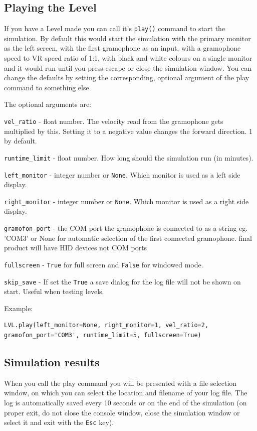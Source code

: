 \documentclass[11pt,a4paper]{article}
\newcommand{\param}[1]{\item \texttt{#1} -}
\newcommand{\enote}[1]{\textcolor{RubineRed}{#1}}
\begin{document}
\subsection{Playing the Level}
If you have a Level made you can call it's \texttt{play()} command to start the simulation. By default this would start the simulation with the primary monitor as the left screen, with the first gramophone as an input, with a gramophone speed to VR speed ratio of 1:1, with black and white colours on a single monitor and it would run until you press escape or close the simulation window. You can change the defaults by setting the corresponding, optional argument of the play command to something else.


The optional arguments are:
\begin{paramlist}

\param{vel\_ratio} float number. The velocity read from the gramophone gets multiplied by this. Setting it to a negative value changes the forward direction. 1 by default.
\param{runtime\_limit} float number. How long should the simulation run (in minutes).
\param{left\_monitor} integer number or \lstinline{None}. Which monitor is used as a left side display.
\param{right\_monitor} integer number or \lstinline{None}. Which monitor is used as a right side display.
\param{gramofon\_port} the COM port the gramophone is connected to as a string eg. 'COM3' or None for automatic selection of the first connected gramophone. \enote{final product will have HID devices not COM ports}
\param{fullscreen} \lstinline{True} for full screen and \lstinline{False} for windowed mode.
\param{skip\_save} If set the \lstinline{True} a save dialog for the log file will not be shown on start. Useful when testing levels.
\end{paramlist}


Example:

\begin{lstlisting}
LVL.play(left_monitor=None, right_monitor=1, vel_ratio=2, gramofon_port='COM3', runtime_limit=5, fullscreen=True)
\end{lstlisting}

\subsection{Simulation results}
When you call the play command you will be presented with a file selection window, on which you can select the location and filename of your log file. The log is automatically saved every 10 seconds or on the end of the simulation (on proper exit, do not close the console window, close the simulation window or select it and exit with the \texttt{Esc} key).\\
\end{document}
